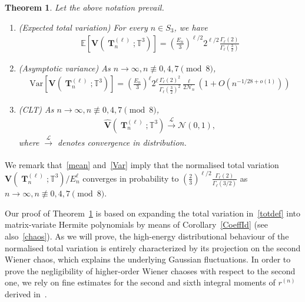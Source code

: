 \documentclass[10pt]{amsart}
\newtheorem{theo}{Theorem}[section]
\theoremstyle{definition}\newtheorem{defi}[theo]{Definition}\newtheorem{rema}[theo]{Remark}\newtheorem{exam}[theo]{Example}\newtheorem{exem}[theo]{Example}\newtheorem{nota}[theo]{Notation}
\DeclareMathOperator{\bT}{\mathbf{T}}
\newcommand{\scN}{\mathscr{N}}
\newcommand{\bfv}{\mathbf{V}}
\newcommand{\T}{\mathbb{T}^3}
\newcommand{\E}[1]{\mathbb{E}\left[#1\right]}
\newcommand{\V}[1]{\mathrm{Var}{\left[#1\right]}}
\newcommand{\Law}{\xrightarrow[]{\mathcal{L}} }
\newcommand{\notcon}[3]{ {#1} \not\equiv {#2} \pmod {#3} }
\newcommand{\Nn}{\mathcal{N}_n}
\newcommand*{\romanenumi}{\renewcommand*{\theenumi}{\roman{enumi}}}
\begin{document}
\begin{theo}\label{ARW}
Let the above notation prevail.
\begin{enumerate}\romanenumi
\item (Expected total variation) For every $n \in S_3$, we have
\begin{gather}\label{mean}
\E{\bfv\left(\bT_n^{(\ell)};\T\right)} =
\left(\frac{E_n}{3}\right)^{\ell/2} 2^{\ell/2}\frac{\Gamma_{\ell}(2)}{\Gamma_{\ell}\left(\frac{3}{2}\right)}
\end{gather}
\item (Asymptotic variance) As $n\to \infty, \notcon{n}{0,4,7}{8}$,
\begin{gather}\label{Var}
\V{\bfv\left(\bT_n^{(\ell)};\T\right)} =
\left(\frac{E_n}{3}\right)^{\ell} 2^{\ell} \frac{\Gamma_{\ell}(2)^2}{\Gamma_{\ell}\left(\frac{3}{2}\right)^2}
\frac{\ell}{2\Nn}\left(1 + O\left(n^{-1/28+o(1)}\right)\right)
\end{gather}
\item (CLT) As $n\to \infty, \notcon{n}{0,4,7}{8}$,
\begin{gather}\label{CLT}
\widehat{\bfv}\left(\bT_n^{(\ell)};\T\right) \Law \scN(0,1),
\end{gather}
where $\Law$ denotes convergence in distribution.
\end{enumerate}
\end{theo}



We remark that~\eqref{mean} and~\eqref{Var} imply that the normalised total variation $\bfv(\bT_n^{(\ell)};\T)/E_n^{\ell}$ converges in probability to $(\frac{2}{3})^{\ell/2}\frac{\Gamma_{\ell}(2)}{\Gamma_{\ell}(3/2)}$ as $n\to \infty,\notcon{n}{0,4,7}{8}$.

Our proof of Theorem~\ref{ARW} is based on expanding the total variation in~\eqref{totdef} into matrix-variate Hermite polynomials by means of Corollary~\ref{CoeffId} (see also~\eqref{chaos}). As we will prove, the high-energy distributional behaviour of the normalised total variation is entirely characterized by its projection on the second Wiener chaos, which explains the underlying Gaussian fluctuations. In order to prove the negligibility of higher-order Wiener chaoses with respect to the second one, we rely on fine estimates for the second and sixth integral moments of $r^{(n)}$ derived in~\cite{BM17}.
\end{document}
